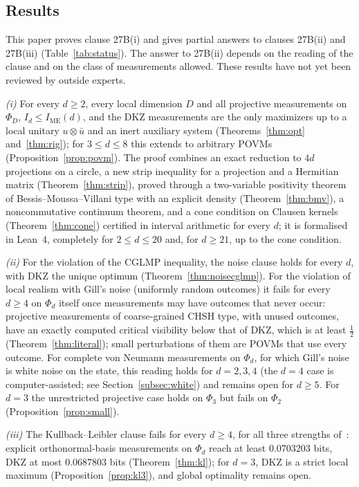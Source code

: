 \documentclass[11pt]{article}
\theoremstyle{remark}
\numberwithin{equation}{section}
\newcommand{\IME}{I_{\mathrm{ME}}}
\begin{document}
\subsection{Results}
This paper proves clause 27B(i) and gives partial answers to clauses 27B(ii) and 27B(iii) (Table~\ref{tab:status}). The
answer to 27B(ii) depends on the reading of the clause and on the class of measurements allowed. These results have not
yet been reviewed by outside experts.

\emph{(i)} For every $d\ge2$, every local dimension $D$ and all projective measurements on $\Phi_D$, $I_d\le\IME(d)$,
and the DKZ measurements are the only maximizers up to a local unitary $u\otimes\bar u$ and an inert auxiliary system
(Theorems~\ref{thm:opt} and~\ref{thm:rig}); for $3\le d\le8$ this extends to arbitrary POVMs
(Proposition~\ref{prop:povm}). The proof combines an exact reduction to $4d$ projections on a circle, a new strip
inequality for a projection and a Hermitian matrix (Theorem~\ref{thm:strip}), proved through a two-variable positivity
theorem of Bessis--Moussa--Villani type with an explicit density (Theorem~\ref{thm:bmv}), a noncommutative continuum
theorem, and a cone condition on Clausen kernels (Theorem~\ref{thm:cone}) certified in interval arithmetic for every $d$;
it is formalised in Lean~4, completely for $2\le d\le20$ and, for $d\ge21$, up to the cone condition.

\emph{(ii)} For the violation of the CGLMP inequality, the noise clause holds for every $d$, with DKZ the unique optimum
(Theorem~\ref{thm:noisecglmp}). For the violation of local realism with Gill's noise (uniformly random outcomes) it fails
for every $d\ge4$ on $\Phi_d$ itself once measurements may have outcomes that never occur: projective measurements of
coarse-grained CHSH type, with unused outcomes, have an exactly computed critical visibility below that of DKZ, which is
at least $\frac12$ (Theorem~\ref{thm:literal}); small perturbations of them are POVMs that use every outcome. For
complete von Neumann measurements on $\Phi_d$, for which Gill's noise is white noise on the state, this reading
holds for $d=2,3,4$ (the $d=4$ case is computer-assisted; see Section~\ref{subsec:white}) and remains open for $d\ge5$.
For $d=3$ the unrestricted projective case holds on $\Phi_3$ but fails on $\Phi_2$ (Proposition~\ref{prop:small}).

\emph{(iii)} The Kullback--Leibler clause fails for every $d\ge4$, for all three strengths of~\cite{vDGG}: explicit
orthonormal-basis measurements on $\Phi_d$ reach at least $0.0703203$ bits, DKZ at most $0.0687803$ bits
(Theorem~\ref{thm:kl}); for $d=3$, DKZ is a strict local maximum (Proposition~\ref{prop:kl3}), and global optimality
remains open.
\end{document}
